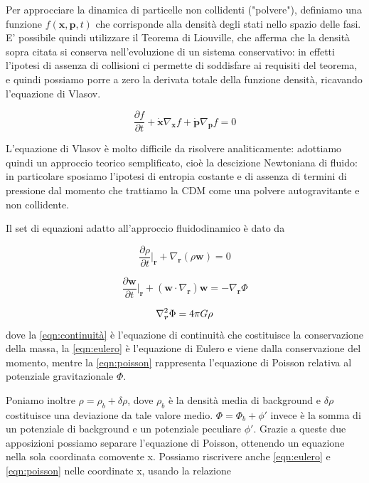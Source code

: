 Per approcciare la dinamica di particelle non collidenti ("polvere"), definiamo una funzione $f(\bm{x}, \bm{p}, t)$ 
che corrisponde alla densità degli stati nello spazio delle fasi. E' possibile quindi utilizzare il Teorema di 
Liouville, che afferma che la densità sopra citata si conserva nell'evoluzione di un sistema conservativo: in
effetti l'ipotesi di assenza di collisioni ci permette di soddisfare ai requisiti del teorema, e quindi 
possiamo porre a zero la derivata totale della funzione densità, ricavando l'equazione di Vlasov.

\begin{equation}
    \label{eqn:vlasov}
    \frac{\partial f}{\partial t} + \dot{\bm{x}} \nabla_{\bm{x}}f + \dot{\bm{p}} \nabla_{\bm{p}}f  = 0
\end{equation}

L'equazione di Vlasov è molto difficile da risolvere analiticamente: adottiamo quindi un approccio 
teorico semplificato, cioè la descizione Newtoniana di fluido: in particolare sposiamo l'ipotesi 
di entropia costante e di assenza di termini di pressione dal momento che trattiamo la CDM come 
una polvere autogravitante e non collidente.

Il set di equazioni adatto all'approccio fluidodinamico è dato da

\begin{equation}
    \label{eqn:continuità}
    \frac{\partial\rho}{\partial t}\biggr|_{\bm{r}} + \nabla_{\bm{r}}(\rho \bm{w}) = 0
\end{equation}

\begin{equation}
    \label{eqn:eulero}
    \frac{\partial\bm{w}}{\partial t}\biggr|_{\bm{r}} + (\bm{w}\cdot\nabla_{\bm{r}})\bm{w} = - \nabla_{\bm{r}} \Phi
\end{equation}

\begin{equation}
    \label{eqn:poisson}
    \laplacian_{\bm{r}}\Phi = 4\pi G \rho
\end{equation}
dove la \ref{eqn:continuità} è l'equazione di continuità che costituisce la conservazione
della massa, la \ref{eqn:eulero} è l'equazione di Eulero e viene dalla conservazione del
momento, mentre la \ref{eqn:poisson} rappresenta l'equazione di Poisson relativa
al potenziale gravitazionale $\Phi$.

Poniamo inoltre $\rho = \rho_b + \delta\rho$, dove $\rho_b$ è la densità media di background
e $\delta\rho$ costituisce una deviazione da tale valore medio. $\Phi = \Phi_b + \phi{'}$ invece
è la somma di un potenziale di background e un potenziale peculiare $\phi{'}$. Grazie a queste due 
apposizioni possiamo separare l'equazione di Poisson, ottenendo un equazione nella sola coordinata
comovente x.
Possiamo riscrivere anche \ref{eqn:eulero} e \ref{eqn:poisson} nelle coordinate x, usando la
relazione

